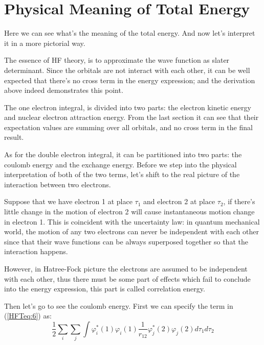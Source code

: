 
\section{Physical Meaning of Total Energy}\label{PMTE_for_HF}
%
Here we can see what's the meaning of the total energy. And now
let's interpret it in a more pictorial way.

The essence of HF theory, is to approximate the wave function as
slater determinant. Since the orbitals are not interact with each
other, it can be well expected that there's no cross term in the
energy expression; and the derivation above indeed demonstrates this
point.

The one electron integral, is divided into two parts: the electron
kinetic energy and nuclear electron attraction energy. From the last
section it can see that their expectation values are summing over
all orbitals, and no cross term in the final result.

As for the double electron integral, it can be partitioned into two
parts: the coulomb energy and the exchange energy. Before we step
into the physical interpretation of both of the two terms, let's
shift to the real picture of the interaction between two electrons.

Suppose that we have electron 1 at place $\tau_{1}$ and electron 2
at place $\tau_{2}$, if there's little change in the motion of
electron 2 will cause instantaneous motion change in electron 1.
This is coincident with the uncertainty law: in quantum mechanical
world, the motion of any two electrons can never be independent with
each other since that their wave functions can be always superposed
together so that the interaction happens.

However, in Hatree-Fock picture the electrons are assumed to be
independent with each other, thus there must be some part of effects
which fail to conclude into the energy expression, this part is
called correlation energy.

Then let's go to see the coulomb energy. First we can specify the
term in (\ref{HFTeq:6}) as:
\begin{equation}\label{}
\frac{1}{2}\sum_{i}\sum_{j} \int
\varphi^{*}_{i}(1)\varphi_{i}(1)
\frac{1}{r_{12}}\varphi^{*}_{j}(2)\varphi_{j}(2)
d\tau_{1} d\tau_{2}
\end{equation}

